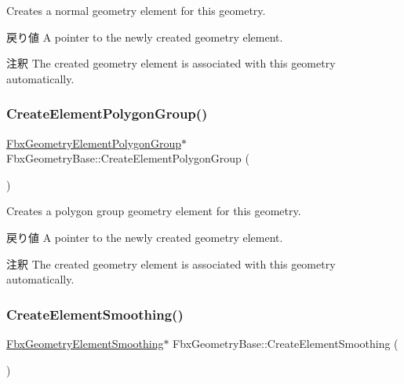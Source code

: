 Creates a normal geometry element for this geometry. \begin{DoxyReturn}{戻り値}
A pointer to the newly created geometry element. 
\end{DoxyReturn}
\begin{DoxyRemark}{注釈}
The created geometry element is associated with this geometry automatically. 
\end{DoxyRemark}
\mbox{\label{class_fbx_geometry_base_a94ad7ac87ced572287ee85460304eb09}} 
\subsubsection{\texorpdfstring{Create\+Element\+Polygon\+Group()}{CreateElementPolygonGroup()}}
{\footnotesize\ttfamily \hyperlink{fbxlayer_8h_aa5c7fb92a1c396014bf2ced7797a95a9}{Fbx\+Geometry\+Element\+Polygon\+Group}$\ast$ Fbx\+Geometry\+Base\+::\+Create\+Element\+Polygon\+Group (\begin{DoxyParamCaption}{ }\end{DoxyParamCaption})}

Creates a polygon group geometry element for this geometry. \begin{DoxyReturn}{戻り値}
A pointer to the newly created geometry element. 
\end{DoxyReturn}
\begin{DoxyRemark}{注釈}
The created geometry element is associated with this geometry automatically. 
\end{DoxyRemark}
\mbox{\label{class_fbx_geometry_base_a998f217dc7383a3fdd5bd4269d424fe3}} 
\subsubsection{\texorpdfstring{Create\+Element\+Smoothing()}{CreateElementSmoothing()}}
{\footnotesize\ttfamily \hyperlink{fbxlayer_8h_a6a651170dec994ac83db90645d9ecfd3}{Fbx\+Geometry\+Element\+Smoothing}$\ast$ Fbx\+Geometry\+Base\+::\+Create\+Element\+Smoothing (\begin{DoxyParamCaption}{ }\end{DoxyParamCaption})}

